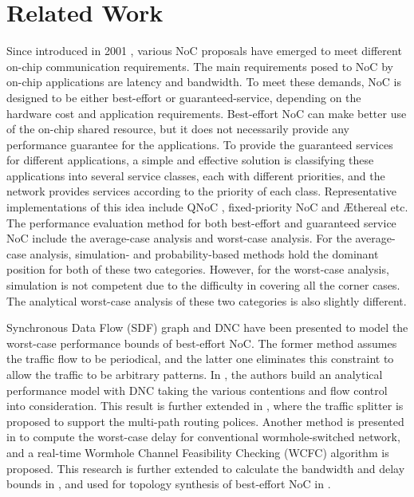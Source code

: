 \documentclass[preprint]{elsarticle}
\begin{document}
\section{Related Work}\label{related}
Since introduced in 2001 \cite{DaTo01}, various NoC proposals have emerged to meet different on-chip communication requirements. The main requirements posed to NoC by on-chip applications are latency and bandwidth. To meet these demands, NoC is designed to be either best-effort or guaranteed-service, depending on the hardware cost and application requirements. Best-effort NoC can make better use of the on-chip shared resource, but it does not necessarily provide any performance guarantee for the applications. To provide the guaranteed services for different applications, a simple and effective solution is classifying these applications into several service classes, each with different priorities, and the network provides services according to the priority of each class. Representative implementations of this idea include QNoC \cite{BCGK04}, fixed-priority NoC \cite{Shi:2008:RCA:1397757.1397996} and {{\AE}thereal} \cite{GoDR05} etc. The performance evaluation method for both best-effort and guaranteed service NoC include the average-case analysis and worst-case analysis. For the average-case analysis, simulation- and probability-based methods hold the dominant position for both of these two categories. However, for the worst-case analysis, simulation is not competent due to the difficulty in covering all the corner cases. The analytical worst-case analysis of these two categories is also slightly different.

Synchronous Data Flow (SDF) graph \cite{poplavko2003task} and DNC \cite{qian2009analysis} have been presented to model the worst-case performance bounds of best-effort NoC. The former method assumes the traffic flow to be periodical, and the latter one eliminates this constraint to allow the traffic to be arbitrary patterns. In \cite{qian2009analysis}, the authors build an analytical performance model with DNC taking the various contentions and flow control into consideration. This result is further extended in \cite{Du:2012:WPA:2380445.2380469}, where the traffic splitter is proposed to support the multi-path routing polices. Another method is presented in \cite{Lee:2003:RWC:846077.846083} to compute the worst-case delay for conventional wormhole-switched network, and a real-time Wormhole Channel Feasibility Checking (WCFC) algorithm is proposed. This research is further extended to calculate the bandwidth and delay bounds in \cite{6109240}, and used for topology synthesis of best-effort NoC in \cite{EPFL-ARTICLE-186879}.
\end{document}

